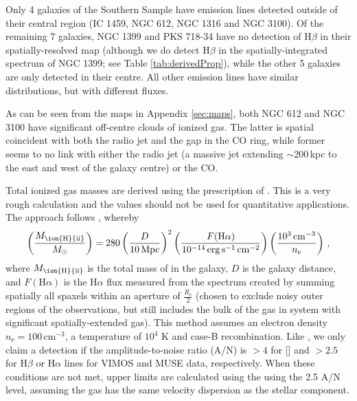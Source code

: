 \documentclass[a4paper,fleqn,usenatbib]{mnras}
\begin{document}
	Only 4 galaxies of the Southern Sample have emission lines detected outside of their central region (IC 1459, NGC 612, NGC 1316 and NGC 3100). Of the remaining 7 galaxies, NGC 1399 and PKS 718-34 have no detection of H$\beta$ in their spatially-resolved map (although we do detect H$\beta$ in the spatially-integrated spectrum of NGC 1399; see Table \ref{tab:derivedProp}), while the other 5 galaxies are only detected in their centre. All other emission lines have similar distributions, but with different fluxes.

	As can be seen from the maps in Appendix \ref{sec:maps}, both NGC 612 and NGC 3100 have significant off-centre clouds of ionized gas. The latter is spatial coincident with both the radio jet and the gap in the CO ring, while former seems to no link with either the radio jet (a massive jet extending $\sim 200$\,kpc to the east and west of the galaxy centre) or the CO. 


	




	Total ionized gas masses are derived using the prescription of \citet{Sarzi2005}. This is a very rough calculation and the values should not be used for quantitative applications. The approach follows \citet{Kim1989}, whereby
	\begin{equation}
		\left(\frac{M_\text{\ion{H}{ii}}}{M_\odot}\right) = 280 \left(\frac{D}{10\, \mathrm{Mpc}}\right)^2 \left(\frac{F(\mathrm{H\alpha})}{10^{-14} \, \mathrm{erg \, s^{-1} \, cm^{-2}}}\right) \left(\frac{10^3 \, \mathrm{cm^{-3}}}{n_\mathrm{e}}\right) \, ,
	\end{equation}
	where $M_\text{\ion{H}{ii}}$ is the total mass of  in the galaxy, $D$ is the galaxy distance, and $F(\mathrm{H\alpha})$ is the H$\alpha$ flux measured from the spectrum created by summing spatially all spaxels within an aperture of $\frac{R_\mathrm{e}}{2}$ (chosen to exclude noisy outer regions of the observations, but still includes the bulk of the gas in system with significant spatially-extended gas). This method assumes an electron density $n_\mathrm{e} = 100 \, \mathrm{cm^{-3}}$, a temperature of $10^4$ K and case-B recombination. Like \citet{Sarzi2005}, we only claim a detection if the amplitude-to-noise ratio (A/N) is $>4$ for [] and $>2.5$ for H$\beta$ or H$\alpha$ lines for VIMOS and MUSE data, respectively. When these conditions are not met, upper limits are calculated using the using the 2.5 A/N level, assuming the gas has the same velocity dispersion as the stellar component.
\end{document}
